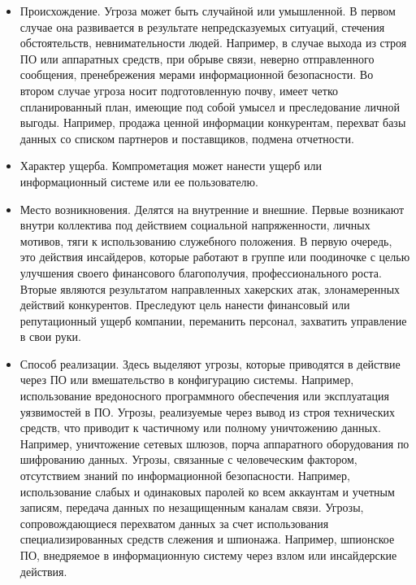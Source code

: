 \begin{itemize} 

	\item Происхождение. Угроза может быть случайной или умышленной. В первом случае она развивается в результате непредсказуемых ситуаций, стечения обстоятельств, невнимательности людей. Например, в случае выхода из строя ПО или аппаратных средств, при обрыве связи, неверно отправленного сообщения, пренебрежения мерами информационной безопасности. Во втором случае угроза носит подготовленную почву, имеет четко спланированный план, имеющие под собой умысел и преследование личной выгоды. Например, продажа ценной информации конкурентам, перехват базы данных со списком партнеров и поставщиков, подмена отчетности.

	\item Характер ущерба. Компрометация может нанести ущерб или информационный системе или ее пользователю.

	\item Место возникновения. Делятся на внутренние и внешние. Первые возникают внутри коллектива под действием социальной напряженности, личных мотивов, тяги к использованию служебного положения. В первую очередь, это действия инсайдеров, которые работают в группе или поодиночке с целью улучшения своего финансового благополучия, профессионального роста. Вторые являются результатом направленных хакерских атак, злонамеренных действий конкурентов. Преследуют цель нанести финансовый или репутационный ущерб компании, переманить персонал, захватить управление в свои руки.

	\item Способ реализации. Здесь выделяют угрозы, которые приводятся в действие через ПО или вмешательство в конфигурацию системы. Например, использование вредоносного программного обеспечения или эксплуатация уязвимостей в ПО. Угрозы, реализуемые через вывод из строя технических средств, что приводит к частичному или полному уничтожению данных. Например, уничтожение сетевых шлюзов, порча аппаратного оборудования по шифрованию данных. Угрозы, связанные с человеческим фактором, отсутствием знаний по информационной безопасности. Например, использование слабых и одинаковых паролей ко всем аккаунтам и учетным записям, передача данных по незащищенным каналам связи. Угрозы, сопровождающиеся перехватом данных за счет использования специализированных средств слежения и шпионажа. Например, шпионское ПО, внедряемое в информационную систему через взлом или инсайдерские действия.

\end{itemize}

